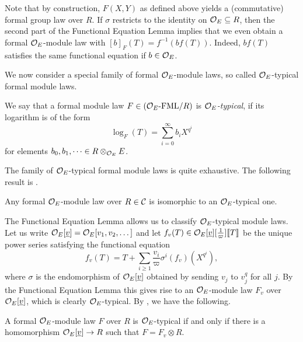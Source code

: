 \documentclass[../main.tex]{subfiles}
\begin{document}
Note that by construction, $F(X,Y)$ as defined above yields a (commutative)
formal group law over $R$. 
If $\sigma$ restricts to the identity on $\mathcal{O}_E \subseteq R$, then 
the second part of the Functional Equation Lemma implies that we even obtain
a formal $\mathcal{O}_E$-module law with $[b]_F(T) = f^{-1}(b f(T))$. Indeed, $bf(T)$
satisfies the same functional equation if $b \in \mathcal{O}_E$. 

We now consider a special family of 
formal $\mathcal{O}_E$-module laws, so called $\mathcal{O}_E$-typical formal module laws.

\begin{defi}\label{def:ATypicFormalModuleLaw}
  We say that a formal module law $F \in {({\mathcal{O}_E}\textnormal-\allowbreak\mathrm{FML}/{R})}$ is 
  \emph{$\mathcal{O}_E$-typical}, if its logarithm is of the form
  \begin{equation*}
    \log_F(T) = \sum_{i=0}^\infty b_i X^{q^i}
  \end{equation*}
  for elements $b_0, b_1, \dots \in R \otimes_{\mathcal{O}_E} E$.
\end{defi}

The family of $\mathcal{O}_E$-typical formal module laws is quite exhaustive.
The following result is \cite[§21.5.6]{hazewinkel1978formal}.

\begin{lem}\label{lem:AnyOModuleIsIsomorphicToAtypic}
  Any formal $\mathcal{O}_E$-module law over $R \in \mathcal{C}$ is isomorphic to an
  $\mathcal{O}_E$-typical one.
\end{lem}

The Functional Equation Lemma allows us to classify $\mathcal{O}_E$-typical module
laws. Let us write $\mathcal{O}_E[\underline v] = \mathcal{O}_E[v_1, v_2, \dots]$ and let
$f_v(T) \in \mathcal{O}_E[\underline v][\tfrac 1\varpi]\llbracket T \rrbracket$ be the unique power series
satisfying the functional equation
\begin{equation*}
  f_v(T) = T + \sum_{i \geq 1} \frac{v_i}{\varpi} \sigma^i(f_v)(X^{q^i}),
\end{equation*}
where $\sigma$ is the endomorphism of $\mathcal{O}_E[\underline v]$ obtained by
sending $v_j$ to $v_j^q$ for all $j$. By the Functional Equation Lemma
this gives rise to an $\mathcal{O}_E$-module law $F_v$ over $\mathcal{O}_E[\underline v]$,
which is clearly $\mathcal{O}_E$-typical.
By \cite[Definition 21.5.5 and Criterion 21.5.9]{hazewinkel1978formal},
we have the following.

\begin{lem}\label{lem:ClassificationOfAtypicalOnes}
  A formal $\mathcal{O}_E$-module law $F$ over $R$ is $\mathcal{O}_E$-typical if and only if there is
  a homomorphism $\mathcal{O}_E[\underline v] \to R$ such that $F = F_v \otimes R$. 
\end{lem}
\end{document}
